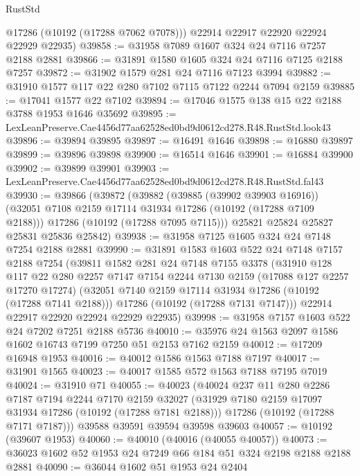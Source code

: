 \begin{lexlean}{RustStd}
\begin{coremodule}
        @17286
        (@10192 (@17288 @7062 @7078)))
      @22914
      @22917
      @22920
      @22924
      @22929
      @22935)
@39858 := @31958 @7089 @1607 @324 @24 @7116 @7257 @2188 @2881
@39866 := @31891 @1580 @1605 @324 @24 @7116 @7125 @2188 @7257
@39872 := @31902 @1579 @281 @24 @7116 @7123 @3994
@39882 := @31910 @1577 @117 @22 @280 @7102 @7115 @7122 @2244 @7094 @2159
@39885 := @17041 @1577 @22 @7102
@39894 := @17046 @1575 @138 @15 @22 @2188 @3788 @1953 @1646 @35692
@39895 := LexLeanPreserve.Cae4456d77aa62528ed0bd9d0612cd278.R48.RustStd.look43
@39896 := @39894 @39895
@39897 := @16491 @1646
@39898 := @16880 @39897
@39899 := @39896 @39898
@39900 := @16514 @1646
@39901 := @16884 @39900
@39902 := @39899 @39901
@39903 := LexLeanPreserve.Cae4456d77aa62528ed0bd9d0612cd278.R48.RustStd.fal43
@39930 := @39866
    (@39872
      (@39882
        (@39885 (@39902 @39903 @16916))
        (@32051 @7108 @2159 @17114 @31934 @17286 (@10192 (@17288 @7109 @2188)))
        @17286
        (@10192 (@17288 @7095 @7115)))
      @25821
      @25824
      @25827
      @25831
      @25836
      @25842)
@39938 := @31958 @7125 @1605 @324 @24 @7148 @7254 @2188 @2881
@39990 := @31891
    @1583
    @1603
    @522
    @24
    @7148
    @7157
    @2188
    @7254
    (@39811
      @1582
      @281
      @24
      @7148
      @7155
      @3378
      (@31910
        @128
        @117
        @22
        @280
        @2257
        @7147
        @7154
        @2244
        @7130
        @2159
        (@17088 @127 @2257 @17270 @17274)
        (@32051 @7140 @2159 @17114 @31934 @17286 (@10192 (@17288 @7141 @2188)))
        @17286
        (@10192 (@17288 @7131 @7147)))
      @22914
      @22917
      @22920
      @22924
      @22929
      @22935)
@39998 := @31958 @7157 @1603 @522 @24 @7202 @7251 @2188 @5736
@40010 := @35976 @24 @1563 @2097 @1586 @1602 @16743 @7199 @7250 @51 @2153 @7162 @2159
@40012 := @17209 @16948 @1953
@40016 := @40012 @1586 @1563 @7188 @7197
@40017 := @31901 @1565
@40023 := @40017 @1585 @572 @1563 @7188 @7195 @7019
@40024 := @31910 @71
@40055 := @40023
    (@40024
      @237
      @11
      @280
      @2286
      @7187
      @7194
      @2244
      @7170
      @2159
      @32027
      (@31929 @7180 @2159 @17097 @31934 @17286 (@10192 (@17288 @7181 @2188)))
      @17286
      (@10192 (@17288 @7171 @7187)))
    @39588
    @39591
    @39594
    @39598
    @39603
@40057 := @10192 (@39607 @1953)
@40060 := @40010 (@40016 (@40055 @40057))
@40073 := @36023 @1602 @52 @1953 @24 @7249 @66 @184 @51 @324 @2198 @2188 @2188 @2881
@40090 := @36044
    @1602
    @51
    @1953
    @24
    @2404

\end{coremodule}
\end{lexlean}
